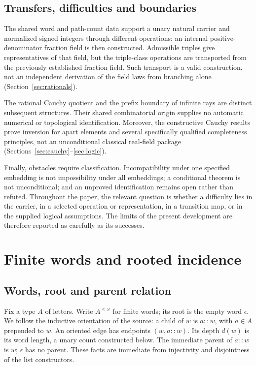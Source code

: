 \documentclass[11pt,reqno]{amsart}
\theoremstyle{definition}\newtheorem{definition}[theorem]{Definition}
\theoremstyle{remark}\newtheorem{remark}[theorem]{Remark}
\begin{document}
\subsection{Transfers, difficulties and boundaries}
The shared word and path-count data support a unary natural carrier and normalized signed integers through different operations; an internal positive-denominator fraction field is then constructed. Admissible triples give representatives of that field, but the triple-class operations are transported from the previously established fraction field. Such transport is a valid construction, not an independent derivation of the field laws from branching alone (Section~\ref{sec:rationals}).

The rational Cauchy quotient and the prefix boundary of infinite rays are distinct subsequent structures. Their shared combinatorial origin supplies no automatic numerical or topological identification. Moreover, the constructive Cauchy results prove inversion for apart elements and several specifically qualified completeness principles, not an unconditional classical real-field package (Sections~\ref{sec:cauchy}--\ref{sec:logic}).

Finally, obstacles require classification. Incompatibility under one specified embedding is not impossibility under all embeddings; a conditional theorem is not unconditional; and an unproved identification remains open rather than refuted. Throughout the paper, the relevant question is whether a difficulty lies in the carrier, in a selected operation or representation, in a transition map, or in the supplied logical assumptions. The limits of the present development are therefore reported as carefully as its successes.

\section{Finite words and rooted incidence}\label{sec:words}
\subsection{Words, root and parent relation}\label{main:sub-01}
Fix a type $A$ of letters. Write $A^{<\omega}$ for finite words; its root is the empty word $\epsilon$. We follow the inductive orientation of the source: a child of $w$ is $a::w$, with $a\in A$ prepended to $w$. An oriented edge has endpoints $(w,a::w)$. Its depth $d(w)$ is its word length, a unary count constructed below. The immediate parent of $a::w$ is $w$; $\epsilon$ has no parent. These facts are immediate from injectivity and disjointness of the list constructors.
\end{document}
